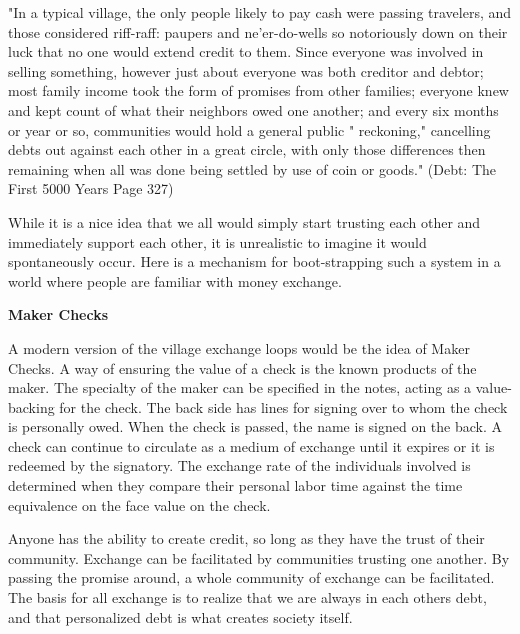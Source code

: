 \documentclass{article}
\begin{document}
	
\begin{minipage}[t]{0.72\textwidth}
	\vspace{0pt}
	"In a typical village, the only people likely to pay cash were passing
	travelers, and those considered riff-raff: paupers and ne'er-do-wells so
	notoriously down on their luck that no one would extend credit to
	them. Since everyone was involved in selling something, however just
	about everyone was both creditor and debtor; most family income took
	the form of promises from other families; everyone knew and kept
	count of what their neighbors owed one another; and every six months
	or year or so, communities would hold a general public " reckoning,"
	cancelling debts out against each other in a great circle, with only those
	differences then remaining when all was done being settled by use of
	coin or goods." (Debt: The First 5000 Years Page 327)
	
	\vspace{0.2cm}
	
	While it is a nice idea that we all would simply start trusting each other and immediately support each other, it is unrealistic to imagine it would spontaneously occur. Here is a mechanism for boot-strapping such a system in a world where people are familiar with money exchange. 
	
{\centering \textbf{Maker Checks}\par}
	
	A modern version of the village exchange loops would be the idea of Maker Checks. A way of ensuring the value of a check is the known products of the maker. The specialty of the maker can be specified in the notes, acting as a value-backing for the check. The back side has lines for signing over to whom the check is personally owed. When the check is passed, the name is signed on the back. A check can continue to circulate as a medium of exchange until it expires or it is redeemed by the signatory. The exchange rate of the individuals involved is determined when they compare their personal labor time against the time equivalence on the face value on the check.
	
	Anyone has the ability to create credit, so long as they have the trust of their community. Exchange can be facilitated by communities trusting one another. By passing the promise around, a whole community of exchange can be facilitated. The  basis for all exchange is to realize that we are always in each others debt, and that personalized debt is what creates society itself. 
	


\end{minipage}%
\end{document}
